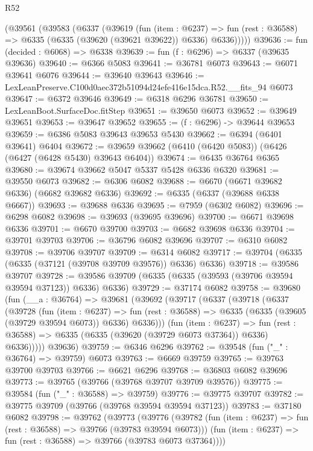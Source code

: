 \begin{lexlean}{R52}
\begin{coremodule}
    (@39561
      (@39583
        (@6337
          (@39619
            (fun (item : @6237) =>
            fun (rest : @36588) => @6335 (@6335 (@39620 (@39621 @39622)) @6336) @6336)))))
@39636 := fun (decided : @6068) => @6338
@39639 := fun (f : @6296) => @6337 (@39635 @39636)
@39640 := @6366 @5083
@39641 := @36781 @6073
@39643 := @6071 @39641 @6076
@39644 := @39640 @39643
@39646 := LexLeanPreserve.C100d0aec372b51094d24efe416e15dca.R52.__fits_94 @6073
@39647 := @6372 @39646
@39649 := @6318 @6296 @36781
@39650 := LexLeanBoot.SurfaceDoc.fitStep
@39651 := @39650 @6073
@39652 := @39649 @39651
@39653 := @39647 @39652
@39655 := (f : @6296) -> @39644 @39653
@39659 := @6386 @5083 @39643 @39653 @5430
@39662 := @6394 (@6401 @39641) @6404
@39672 := @39659 @39662 (@6410 (@6420 @5083)) (@6426 (@6427 (@6428 @5430) @39643 @6404))
@39674 := @6435 @36764 @6365
@39680 := @39674 @39662 @5047 @5337 @5428 @6336 @6320
@39681 := @39550 @6073
@39682 := @6306 @6082
@39688 := @6670 (@6671 @39682 @6336) (@6682 @39682 @6336)
@39692 := @6335 (@6337 (@39688 @6338 @6667))
@39693 := @39688 @6336
@39695 := @7959 (@6302 @6082)
@39696 := @6298 @6082
@39698 := @39693 (@39695 @39696)
@39700 := @6671 @39698 @6336
@39701 := @6670 @39700
@39703 := @6682 @39698 @6336
@39704 := @39701 @39703
@39706 := @36796 @6082 @39696
@39707 := @6310 @6082
@39708 := @39706 @39707
@39709 := @6314 @6082
@39717 := @39704 (@6335 (@6335 (@37121 (@39708 @39709 @39576)) @6336) @6336)
@39718 := @39586 @39707
@39728 := @39586 @39709 (@6335 (@6335 (@39593 (@39706 @39594 @39594 @37123)) @6336) @6336)
@39729 := @37174 @6082
@39758 := @39680
    (fun (__a : @36764) =>
    @39681
      (@39692
        (@39717
          (@6337
            (@39718
              (@6337
                (@39728
                  (fun (item : @6237) =>
                  fun (rest : @36588) => @6335 (@6335 (@39605 (@39729 @39594 @6073)) @6336) @6336)))
              (fun (item : @6237) =>
              fun (rest : @36588) => @6335 (@6335 (@39620 (@39729 @6073 @37364)) @6336) @6336)))))
      @39636)
@39759 := @6346 @6296
@39762 := @39548 (fun ("_" : @36764) => @39759) @6073
@39763 := @6669 @39759
@39765 := @39763 @39700 @39703
@39766 := @6621 @6296
@39768 := @36803 @6082 @39696
@39773 := @39765 (@39766 (@39768 @39707 @39709 @39576))
@39775 := @39584 (fun ("_" : @36588) => @39759)
@39776 := @39775 @39707
@39782 := @39775 @39709 (@39766 (@39768 @39594 @39594 @37123))
@39783 := @37180 @6082
@39798 := @39762
    (@39773
      (@39776
        (@39782 (fun (item : @6237) => fun (rest : @36588) => @39766 (@39783 @39594 @6073)))
        (fun (item : @6237) => fun (rest : @36588) => @39766 (@39783 @6073 @37364))))

\end{coremodule}
\end{lexlean}
